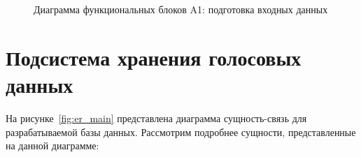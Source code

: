 \begin{figure}
    \caption{Диаграмма функциональных блоков A1: подготовка входных данных}
    \label{fig:idef0_pre}
\end{figure}

\section{Подсистема хранения голосовых данных}

На рисунке~\ref{fig:er_main} представлена диаграмма сущность-связь для разрабатываемой базы данных. Рассмотрим подробнее сущности, представленные на данной диаграмме:


